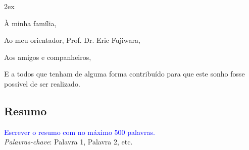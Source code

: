 \vspace*{1cm}
\begin{trivlist}  \itemsep 2ex  \normalsize

\item À minha família,

\item Ao meu orientador, Prof. Dr. Eric Fujiwara,

\item Aos amigos e companheiros,

\item E a todos que tenham de alguma forma contribuído para que este sonho fosse possível de ser realizado.

\end{trivlist}




\clearpage

\begin{center}
\chapter*{Resumo}
\end{center}
\vspace{24pt}
\onehalfspacing
\noindent
\textcolor{Blue}{Escrever o resumo com no máximo 500 palavras.}\\

\vspace{1cm}
\noindent
\emph{Palavras-chave}: Palavra 1, Palavra 2, etc.
\\


